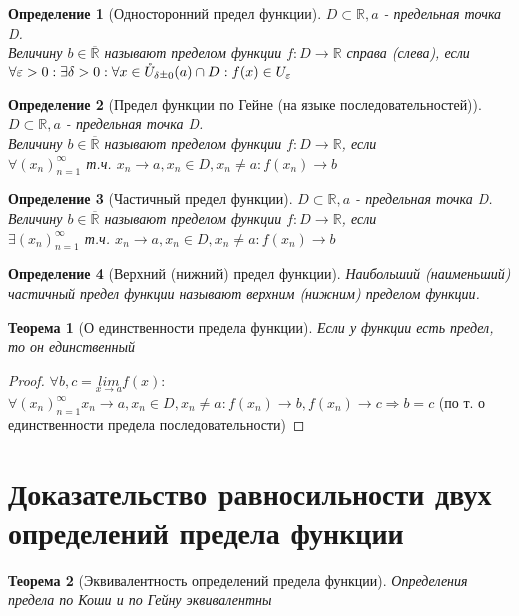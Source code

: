 \documentclass[12pt, a4]{article}
\newtheorem*{theorem}{Теорема}
\newtheorem*{definition}{Определение}
\renewcommand{\lim}[2]{\underset{#1 \rightarrow #2}{lim}}
\renewcommand{\implies}{\Rightarrow}
\renewcommand{\epsilon}{\varepsilon}
\newcommand{\rpm}{\raisebox{.2ex}{$\scriptstyle\pm$}}
\newcommand{\R}{\mathbb{R}}
\renewcommand{\U}{\mathring{U}}
\begin{document}
\begin{definition}[Односторонний предел функции]
$D \subset \R, a$ - предельная точка D.\\
Величину $b \in \overline{\R}$ называют пределом функции $f: D \to \R$ справа (слева), если\\
$\forall \epsilon > 0: \exists \delta > 0: \forall x \in \U_{\delta\rpm0}(a) \cap D: f(x) \in U_\epsilon$
\end{definition}

\begin{definition}[Предел функции  по Гейне (на языке последовательностей)]
$D \subset \R, a$ - предельная точка D.\\
Величину $b \in \overline{\R}$ называют пределом функции $f: D \to \R$, если\\
$\forall (x_n)_{n=1}^\infty$ т.ч. $x_n \to a, x_n \in D, x_n \neq a: f(x_n) \to b$
\end{definition}

\begin{definition}[Частичный предел функции]
$D \subset \R, a$ - предельная точка D.\\
Величину $b \in \overline{\R}$ называют пределом функции $f: D \to \R$, если\\
$\exists (x_n)_{n=1}^\infty$ т.ч. $x_n \to a, x_n \in D, x_n \neq a: f(x_n) \to b$
\end{definition}

\begin{definition}[Верхний (нижний) предел функции]
Наибольший (наименьший) частичный предел функции называют верхним (нижним) пределом функции.
\end{definition}

\begin{theorem}[О единственности предела функции]
Если у функции есть предел, то он единственный
\end{theorem}

\begin{proof}
$\forall b, c = \lim{x}{a}f(x):$\\
$\forall (x_n)_{n=1}^\infty x_n\to a, x_n\in D, x_n \neq a: f(x_n) \to b, f(x_n) \to c \implies b = c$ (по т. о единственности предела последовательности)
\end{proof}

\section{Доказательство равносильности двух определений предела функции}
\begin{theorem}[Эквивалентность определений предела функции]
Определения предела по Коши и по Гейну эквивалентны
\end{theorem}
\end{document}
